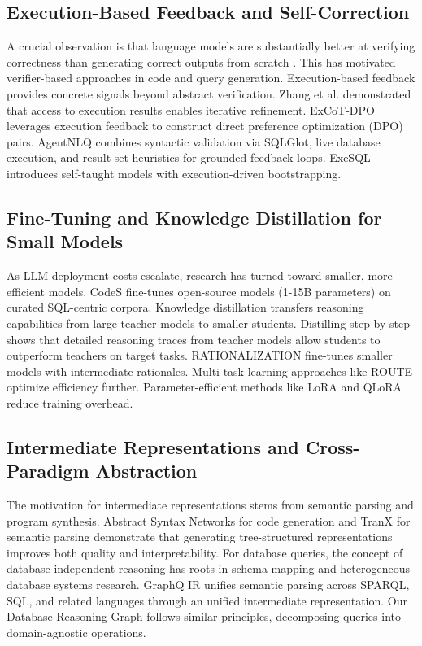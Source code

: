 \documentclass[conference]{IEEEtran}
\begin{document}
\subsection{Execution-Based Feedback and Self-Correction}

A crucial observation is that language models are substantially better at verifying correctness than generating correct outputs from scratch \cite{b13}. This has motivated verifier-based approaches in code and query generation. Execution-based feedback provides concrete signals beyond abstract verification. Zhang et al. \cite{c26} demonstrated that access to execution results enables iterative refinement. ExCoT-DPO \cite{c27} leverages execution feedback to construct direct preference optimization (DPO) pairs. AgentNLQ \cite{c28} combines syntactic validation via SQLGlot, live database execution, and result-set heuristics for grounded feedback loops. ExeSQL \cite{c29} introduces self-taught models with execution-driven bootstrapping.

\subsection{Fine-Tuning and Knowledge Distillation for Small Models}

As LLM deployment costs escalate, research has turned toward smaller, more efficient models. CodeS \cite{c30} fine-tunes open-source models (1-15B parameters) on curated SQL-centric corpora. Knowledge distillation transfers reasoning capabilities from large teacher models to smaller students. Distilling step-by-step \cite{c31} shows that detailed reasoning traces from teacher models allow students to outperform teachers on target tasks. RATIONALIZATION \cite{c32} fine-tunes smaller models with intermediate rationales. Multi-task learning approaches like ROUTE \cite{c33} optimize efficiency further. Parameter-efficient methods like LoRA \cite{c34} and QLoRA \cite{c35} reduce training overhead.

\subsection{Intermediate Representations and Cross-Paradigm Abstraction}

The motivation for intermediate representations stems from semantic parsing and program synthesis. Abstract Syntax Networks \cite{b11} for code generation and TranX \cite{c36} for semantic parsing demonstrate that generating tree-structured representations improves both quality and interpretability. For database queries, the concept of database-independent reasoning has roots in schema mapping and heterogeneous database systems research. GraphQ IR \cite{c37} unifies semantic parsing across SPARQL, SQL, and related languages through an unified intermediate representation. Our Database Reasoning Graph follows similar principles, decomposing queries into domain-agnostic operations.
\end{document}
